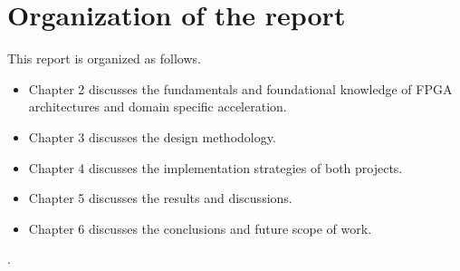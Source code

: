 \section[Organization of the report]{\textbf{Organization of the report}}

This report is organized as follows. 
\begin{itemize}
\item Chapter 2 discusses the fundamentals and foundational knowledge of FPGA architectures and domain specific acceleration.
\item Chapter 3 discusses the design methodology.
\item Chapter 4 discusses the implementation strategies of both projects.
\item Chapter 5 discusses the results and discussions.
\item Chapter 6 discusses the conclusions and future scope of work.
\end{itemize}

.